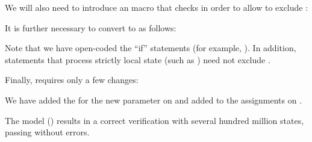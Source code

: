 

We will also need to introduce an 
macro that checks  in order to allow
 to exclude :



It is further necessary to convert 
to  as follows:



\begin{fcvref}
Note that we have open-coded the ``if'' statements
(for example, ).
In addition, statements that process strictly local state
(such as ) need not exclude .
\end{fcvref}

Finally,  requires only a few changes:



\begin{fcvref}
We have added the  for the new
 parameter on  and
added  to the 
assignments on .
\end{fcvref}

The model ()
results in a correct verification with several hundred million
states, passing without errors.

